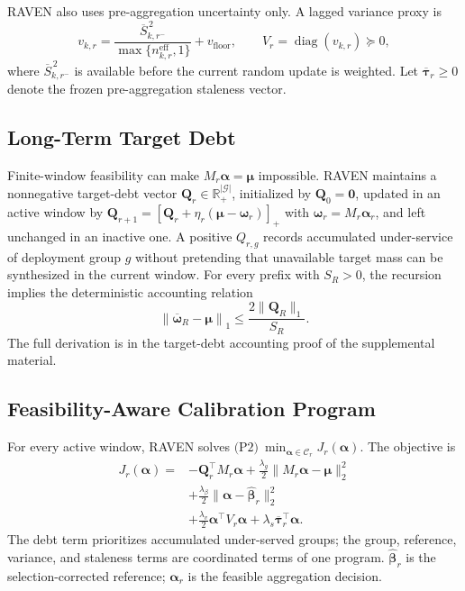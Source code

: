 \documentclass[letterpaper,journal]{IEEEtran}
\begin{document}
RAVEN also uses pre-aggregation uncertainty only.  A lagged variance proxy is
\begin{equation}
 v_{k,r}
 =
 \frac{
 \overline S_{k,r^-}^{\,2}
 }{
 \max\{n^{\mathrm{eff}}_{k,r},1\}
 }
 +
 v_{\mathrm{floor}},
 \qquad
 V_r=\operatorname{diag}(v_{k,r})\succeq0,
 \label{eq:variance_proxy}
\end{equation}
where $\overline S_{k,r^-}^{\,2}$ is available before the current random update
is weighted.  Let $\overline{\boldsymbol\tau}_r\ge0$ denote the frozen
pre-aggregation staleness vector.

\subsection{Long-Term Target Debt}
\label{subsec:debt}

Finite-window feasibility can make
$M_r\boldsymbol\alpha=\boldsymbol\mu$ impossible.  RAVEN maintains a
nonnegative target-debt vector
$\mathbf{Q}_r\in\mathbb{R}^{|\mathcal{G}|}_+$, initialized by
$\mathbf{Q}_0=\mathbf{0}$, updated in an active window by
$\mathbf{Q}_{r+1}=\left[\mathbf{Q}_r+\eta_r(\boldsymbol\mu-\boldsymbol\omega_r)\right]_+$
with $\boldsymbol\omega_r=M_r\boldsymbol\alpha_r$, and left unchanged in an
inactive one.  A positive $Q_{r,g}$ records accumulated under-service of
deployment group $g$ without pretending that unavailable target mass can be
synthesized in the current window.  For every prefix with $S_R>0$, the recursion
implies the deterministic accounting relation
\begin{equation}
 \left\|
 \overline{\boldsymbol\omega}_R-\boldsymbol\mu
 \right\|_1
 \le
 \frac{
 2\|\mathbf{Q}_R\|_1
 }{S_R}.
 \label{eq:debt_bound}
\end{equation}
The full derivation is in the target-debt accounting proof of the supplemental
material.

\subsection{Feasibility-Aware Calibration Program}
\label{subsec:P2}

For every active window, RAVEN solves
$\text{(P2)}\ \min_{\boldsymbol\alpha\in\mathcal{C}_r}J_r(\boldsymbol\alpha)$.
The objective is
\begin{align}
 J_r(\boldsymbol\alpha)
 ={}&-\mathbf{Q}_r^{\top}M_r\boldsymbol\alpha
 +\frac{\lambda_g}{2}
 \|M_r\boldsymbol\alpha-\boldsymbol\mu\|_2^2
 \nonumber\\
 &+\frac{\lambda_{\beta}}{2}
 \|\boldsymbol\alpha-\widehat{\boldsymbol\beta}_r\|_2^2
 \nonumber\\
 &+\frac{\lambda_v}{2}
 \boldsymbol\alpha^{\top}V_r\boldsymbol\alpha
 +\lambda_s\overline{\boldsymbol\tau}_r^{\top}\boldsymbol\alpha.
\label{eq:P2_objective}
\end{align}
The debt term prioritizes accumulated under-served groups; the group,
reference, variance, and staleness terms are coordinated terms of one
program.  $\widehat{\boldsymbol\beta}_r$ is the selection-corrected
reference; $\boldsymbol\alpha_r$ is the feasible aggregation decision.
\end{document}
